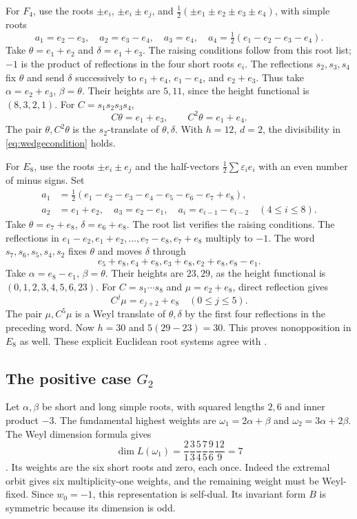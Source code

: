 \documentclass[11pt]{article}
\theoremstyle{definition}\newtheorem{definition}[theorem]{Definition}
\theoremstyle{remark}\newtheorem{remark}[theorem]{Remark}
\begin{document}
For $F_4$, use the roots $\pm e_i$, $\pm e_i\pm e_j$, and $\tfrac12(\pm e_1\pm e_2\pm e_3\pm e_4)$, with simple roots
\[
 a_1=e_2-e_3,\quad a_2=e_3-e_4,\quad a_3=e_4,\quad
 a_4=\tfrac12(e_1-e_2-e_3-e_4).
\]
Take $\theta=e_1+e_2$ and $\delta=e_1+e_3$. The raising conditions follow from this root list; $-1$ is the product of reflections in the four short roots $e_i$. The reflections $s_2,s_3,s_4$ fix $\theta$ and send $\delta$ successively to $e_1+e_4$, $e_1-e_4$, and $e_2+e_3$. Thus take $\alpha=e_2+e_3$, $\beta=\theta$. Their heights are $5,11$, since the height functional is $(8,3,2,1)$. For $C=s_1s_2s_3s_4$,
\[
 C\theta=e_1+e_3,\qquad C^2\theta=e_1+e_4.
\]
The pair $\theta,C^2\theta$ is the $s_2$-translate of $\theta,\delta$. With $h=12$, $d=2$, the divisibility in \eqref{eq:wedgecondition} holds.

For $E_8$, use the roots $\pm e_i\pm e_j$ and the half-vectors $\tfrac12\sum\varepsilon_ie_i$ with an even number of minus signs. Set
\begin{align*}
 a_1&=\tfrac12(e_1-e_2-e_3-e_4-e_5-e_6-e_7+e_8),\\
 a_2&=e_1+e_2,\quad a_3=e_2-e_1,\quad
 a_i=e_{i-1}-e_{i-2}\quad(4\leq i\leq8).
\end{align*}
Take $\theta=e_7+e_8$, $\delta=e_6+e_8$. The root list verifies the raising conditions. The reflections in $e_1-e_2,e_1+e_2,\ldots,e_7-e_8,e_7+e_8$ multiply to $-1$. The word $s_7,s_6,s_5,s_4,s_2$ fixes $\theta$ and moves $\delta$ through
\[
 e_5+e_8, e_4+e_8, e_3+e_8, e_2+e_8, e_8-e_1.
\]
Take $\alpha=e_8-e_1$, $\beta=\theta$. Their heights are $23,29$, as the height functional is $(0,1,2,3,4,5,6,23)$. For $C=s_1\cdots s_8$ and $\mu=e_2+e_8$, direct reflection gives
\[
 C^j\mu=e_{j+2}+e_8\quad(0\leq j\leq5).
\]
The pair $\mu,C^5\mu$ is a Weyl translate of $\theta,\delta$ by the first four reflections in the preceding word. Now $h=30$ and $5(29-23)=30$. This proves nonopposition in $E_8$ as well. These explicit Euclidean root systems agree with \citet[\S24(l), pp.~539--542]{Milne2017}.

\subsection{The positive case \texorpdfstring{$G_2$}{G2}}
Let $\alpha,\beta$ be short and long simple roots, with squared lengths $2,6$ and inner product $-3$. The fundamental highest weights are $\omega_1=2\alpha+\beta$ and $\omega_2=3\alpha+2\beta$. The Weyl dimension formula gives
\[
 \dim L(\omega_1)=\frac21\frac33\frac54\frac75\frac96\frac{12}9=7
\]
\citep[Proposition~28.1, p.~125]{Etingof}. Its weights are the six short roots and zero, each once. Indeed the extremal orbit gives six multiplicity-one weights, and the remaining weight must be Weyl-fixed. Since $w_0=-1$, this representation is self-dual. Its invariant form $B$ is symmetric because its dimension is odd.
\end{document}

